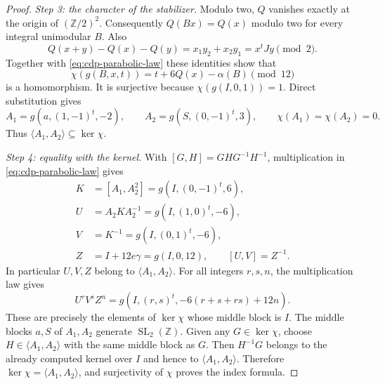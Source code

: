 \begin{proof}
\textit{Step 3: the character of the stabilizer.}
Modulo two, $Q$ vanishes exactly at the origin of $(\mathbb Z/2)^2$.
Consequently $Q(Bx)=Q(x)$ modulo two for every integral unimodular
$B$. Also
\[
 Q(x+y)-Q(x)-Q(y)=x_1y_2+x_2y_1=x^tJy\pmod2.
\]
Together with \eqref{eq:cdp-parabolic-law} these identities show that
\[
 \chi(g(B,x,t))=t+6Q(x)-\alpha(B)\pmod {12}
\]
is a homomorphism. It is surjective because
$\chi(g(I,0,1))=1$. Direct substitution gives
\[
 A_1=g(a,(1,-1)^t,-2),\qquad A_2=g(S,(0,-1)^t,3),
 \qquad \chi(A_1)=\chi(A_2)=0.
\]
Thus $\langle A_1,A_2\rangle\subseteq\ker\chi$.

\textit{Step 4: equality with the kernel.}
With $[G,H]=GHG^{-1}H^{-1}$, multiplication in
\eqref{eq:cdp-parabolic-law} gives
\[
 \begin{aligned}
 K&=[A_1,A_2^2]=g(I,(0,-1)^t,6),\\
 U&=A_2KA_2^{-1}=g(I,(1,0)^t,-6),\\
 V&=K^{-1}=g(I,(0,1)^t,-6),\\
 Z&=I+12e\gamma=g(I,0,12),\qquad [U,V]=Z^{-1}.
 \end{aligned}
\]
In particular $U,V,Z$ belong to $\langle A_1,A_2\rangle$. For all
integers $r,s,n$, the multiplication law gives
\[
 U^rV^sZ^n=g(I,(r,s)^t,-6(r+s+rs)+12n).
\]
These are precisely the elements of $\ker\chi$ whose middle block
is $I$. The middle blocks $a,S$ of $A_1,A_2$ generate
$\operatorname{SL}_2(\mathbb Z)$. Given any $G\in\ker\chi$, choose
$H\in\langle A_1,A_2\rangle$ with the same middle block as $G$.
Then $H^{-1}G$ belongs to the already computed kernel over $I$ and
hence to $\langle A_1,A_2\rangle$. Therefore
$\ker\chi=\langle A_1,A_2\rangle$, and surjectivity of $\chi$ proves
the index formula.
\end{proof}
